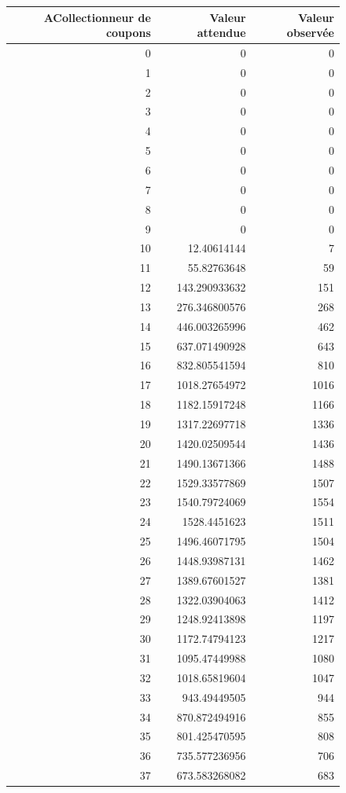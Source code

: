 \documentclass[10pt,a4paper]{article}
\begin{document}
 \begin{figure}[h]
\centering
\begin{tabular}{|r|r|r|}
\hline
ACollectionneur de coupons & Valeur attendue & Valeur observée\\
\hline
0 & 0 & 0\\
1 & 0 & 0\\
2 & 0 & 0\\
3 & 0 & 0\\
4 & 0 & 0\\
5 & 0 & 0\\
6 & 0 & 0\\
7 & 0 & 0\\
8 & 0 & 0\\
9 & 0 & 0\\
10 & 12.40614144 & 7\\
11 & 55.82763648 & 59\\
12 & 143.290933632 & 151\\
13 & 276.346800576 & 268\\
14 & 446.003265996 & 462\\
15 & 637.071490928 & 643\\
16 & 832.805541594 & 810\\
17 & 1018.27654972 & 1016\\
18 & 1182.15917248 & 1166\\
19 & 1317.22697718 & 1336\\
20 & 1420.02509544 & 1436\\
21 & 1490.13671366 & 1488\\
22 & 1529.33577869 & 1507\\
23 & 1540.79724069 & 1554\\
24 & 1528.4451623 & 1511\\
25 & 1496.46071795 & 1504\\
26 & 1448.93987131 & 1462\\
27 & 1389.67601527 & 1381\\
28 & 1322.03904063 & 1412\\
29 & 1248.92413898 & 1197\\
30 & 1172.74794123 & 1217\\
31 & 1095.47449988 & 1080\\
32 & 1018.65819604 & 1047\\
33 & 943.49449505 & 944\\
34 & 870.872494916 & 855\\
35 & 801.425470595 & 808\\
36 & 735.577236956 & 706\\
37 & 673.583268082 & 683\\

\end{tabular}
\end{figure}
\end{document}
